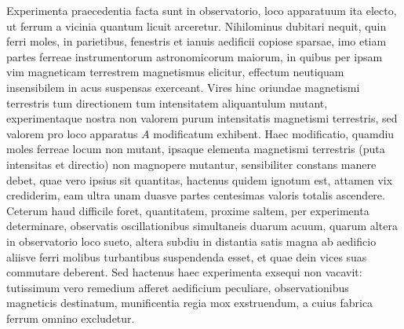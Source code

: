 Experimenta praecedentia facta sunt in observatorio, loco apparatuum ita electo, ut ferrum a vicinia quantum licuit arceretur. Nihilominus dubitari nequit, quin ferri moles, in parietibus, fenestris et ianuis aedificii copiose sparsae, imo etiam partes ferreae instrumentorum astronomicorum maiorum, in quibus per ipsam vim magneticam terrestrem magnetismus elicitur, effectum neutiquam insensibilem in acus suspensas exerceant. Vires hinc oriundae magnetismi terrestris tum directionem tum intensitatem aliquantulum mutant, experimentaque nostra non valorem purum intensitatis magnetismi terrestris, sed valorem pro loco apparatus $A$ modificatum exhibent. Haec modificatio, quamdiu moles ferreae locum non mutant, ipsaque elementa magnetismi terrestris (puta intensitas et directio) non magnopere mutantur, sensibiliter constans manere debet, quae vero ipsius sit quantitas, hactenus quidem ignotum est, attamen vix crediderim, eam ultra unam duasve partes centesimas valoris totalis ascendere. Ceterum haud difficile foret, quantitatem, proxime saltem, per experimenta determinare, observatis oscillationibus simultaneis duarum acuum, quarum altera in observatorio loco sueto, altera subdiu in distantia satis magna ab aedificio aliisve ferri molibus turbantibus suspendenda esset, et quae dein vices suas commutare deberent. Sed hactenus haec experimenta exsequi non vacavit: tutissimum vero remedium afferet aedificium peculiare, observationibus magneticis destinatum, munificentia regia mox exstruendum, a cuius fabrica ferrum omnino excludetur.

